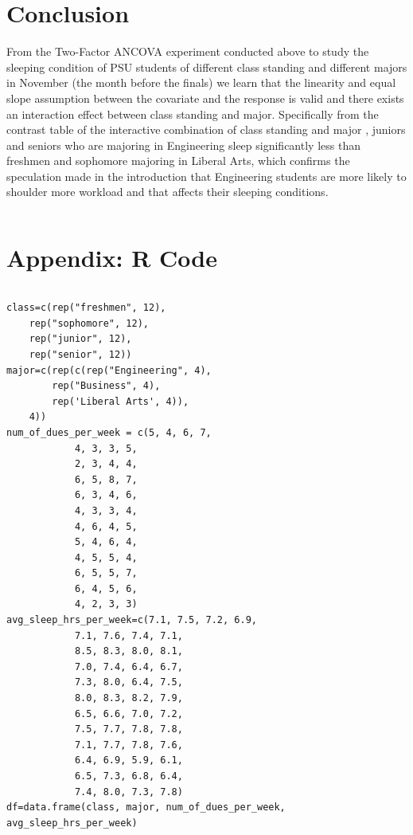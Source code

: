 \documentclass{article} %
\begin{document}
\section{Conclusion}


From the Two-Factor ANCOVA experiment conducted above to study the sleeping condition of PSU students of different class standing and different majors in November (the month before the finals) we learn that the linearity and equal slope assumption between the covariate and the response is valid and there exists an interaction effect between class standing and major. Specifically from the contrast table of the interactive combination of class standing and major , juniors and seniors who are majoring in Engineering sleep significantly less than freshmen and sophomore majoring in Liberal Arts, which confirms the speculation made in the introduction that Engineering students are more likely to shoulder more workload and that affects their sleeping conditions. 

\[\]

\section{Appendix: R Code}

\[\]

\appendix

\lstset{language=R}
\lstset{showstringspaces=false}
\lstset{frame=lines}
\lstset{basicstyle=\footnotesize}
\begin{lstlisting}
class=c(rep("freshmen", 12), 
	rep("sophomore", 12),
	rep("junior", 12),
	rep("senior", 12))
major=c(rep(c(rep("Engineering", 4), 
		rep("Business", 4),
		rep('Liberal Arts', 4)),
	4))
num_of_dues_per_week = c(5, 4, 6, 7,
			4, 3, 3, 5,
			2, 3, 4, 4,
			6, 5, 8, 7,
			6, 3, 4, 6,
			4, 3, 3, 4,
			4, 6, 4, 5,
			5, 4, 6, 4,
			4, 5, 5, 4,
			6, 5, 5, 7,
			6, 4, 5, 6,
			4, 2, 3, 3)
avg_sleep_hrs_per_week=c(7.1, 7.5, 7.2, 6.9, 
			7.1, 7.6, 7.4, 7.1,
			8.5, 8.3, 8.0, 8.1,
			7.0, 7.4, 6.4, 6.7,
			7.3, 8.0, 6.4, 7.5,
			8.0, 8.3, 8.2, 7.9,
			6.5, 6.6, 7.0, 7.2,
			7.5, 7.7, 7.8, 7.8,
			7.1, 7.7, 7.8, 7.6,
			6.4, 6.9, 5.9, 6.1,
			6.5, 7.3, 6.8, 6.4,
			7.4, 8.0, 7.3, 7.8)
df=data.frame(class, major, num_of_dues_per_week, avg_sleep_hrs_per_week)
\end{lstlisting}
\end{document}
